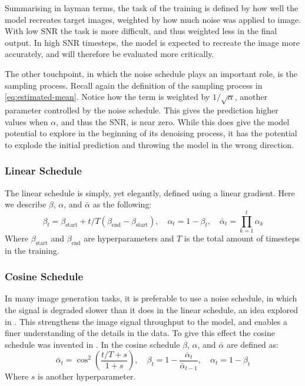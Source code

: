 Summarising in layman terms, the task of the training is defined by how well the model recreates target images, weighted by how much noise was applied to image. With low SNR the task is more difficult, and thus weighted less in the final output. In high SNR timesteps, the model is expected to recreate the image more accurately, and will therefore be evaluated more critically.

The other touchpoint, in which the noise schedule plays an important role, is the sampling process. Recall again the definition of the sampling process in \cref{eq:estimated-mean}. Notice how the term is weighted by $1 / \sqrt{\alpha}$, another parameter controlled by the noise schedule. This gives the prediction higher values when $\alpha$, and thus the SNR, is near zero. While this does give the model potential to explore in the beginning of its denoising process, it has the potential to explode the initial prediction and throwing the model in the wrong direction. %

\subsubsection{Linear Schedule}

The linear schedule is simply, yet elegantly, defined using a linear gradient. Here we describe $\beta$, $\alpha$, and $\bar{\alpha}$ as the following:
\begin{equation}
    \beta_t = \beta_{\text{start}} + t/T (\beta_{\text{end}} - \beta_{\text{start}}), \quad \alpha_t = 1-\beta_t, \quad \bar{\alpha}_t = \prod_{k=1}^{t} \alpha_k
\end{equation}
Where $\beta_{\text{start}}$ and $\beta_{\text{end}}$ are hyperparameters and $T$ is the total amount of timesteps in the training.

\subsubsection{Cosine Schedule}

In many image generation tasks, it is preferable to use a noise schedule, in which the signal is degraded slower than it does in the linear schedule, an idea explored in \cite{better-ddpm}. This strengthens the image signal throughput to the model, and enables a finer understanding of the details in the data. To give this effect the cosine schedule was invented in \cite{better-ddpm}. In the cosine schedule $\beta$, $\alpha$, and $\bar{\alpha}$ are defined as:
\begin{equation}
    \bar{\alpha}_t = \cos^2 \left( \frac{t/T + s}{1 + s} \right), \quad \beta_t = 1 - \frac{\bar{\alpha}_t}{\bar{\alpha}_{t-1}}, \quad \alpha_t = 1 - \beta_t
\end{equation}
Where $s$ is another hyperparameter.


